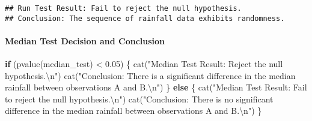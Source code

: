 \documentclass[
]{article}
\newenvironment{Shaded}{\begin{snugshade}}{\end{snugshade}}
\newcommand{\ControlFlowTok}[1]{\textcolor[rgb]{0.13,0.29,0.53}{\textbf{#1}}}
\newcommand{\FloatTok}[1]{\textcolor[rgb]{0.00,0.00,0.81}{#1}}
\newcommand{\FunctionTok}[1]{\textcolor[rgb]{0.00,0.00,0.00}{#1}}
\newcommand{\NormalTok}[1]{#1}
\newcommand{\SpecialCharTok}[1]{\textcolor[rgb]{0.00,0.00,0.00}{#1}}
\newcommand{\StringTok}[1]{\textcolor[rgb]{0.31,0.60,0.02}{#1}}
\begin{document}
\begin{Shaded}
\end{Shaded}

\begin{verbatim}
## Run Test Result: Fail to reject the null hypothesis.
## Conclusion: The sequence of rainfall data exhibits randomness.
\end{verbatim}

\hypertarget{median-test-decision-and-conclusion}{%
\paragraph{Median Test Decision and
Conclusion}\label{median-test-decision-and-conclusion}}

\begin{Shaded}
\begin{Highlighting}[]
\ControlFlowTok{if}\NormalTok{ (}\FunctionTok{pvalue}\NormalTok{(median\_test) }\SpecialCharTok{\textless{}} \FloatTok{0.05}\NormalTok{) \{}
  \FunctionTok{cat}\NormalTok{(}\StringTok{"Median Test Result: Reject the null hypothesis.}\SpecialCharTok{\textbackslash{}n}\StringTok{"}\NormalTok{)}
  \FunctionTok{cat}\NormalTok{(}\StringTok{"Conclusion: There is a significant difference in the median rainfall between observations A and B.}\SpecialCharTok{\textbackslash{}n}\StringTok{"}\NormalTok{)}
\NormalTok{\} }\ControlFlowTok{else}\NormalTok{ \{}
  \FunctionTok{cat}\NormalTok{(}\StringTok{"Median Test Result: Fail to reject the null hypothesis.}\SpecialCharTok{\textbackslash{}n}\StringTok{"}\NormalTok{)}
  \FunctionTok{cat}\NormalTok{(}\StringTok{"Conclusion: There is no significant difference in the median rainfall between observations A and B.}\SpecialCharTok{\textbackslash{}n}\StringTok{"}\NormalTok{)}
\NormalTok{\}}
\end{Highlighting}
\end{Shaded}
\end{document}
